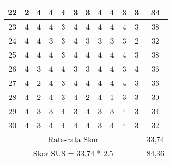 \begin{landscape}
\begin{longtable}{|c|c|c|c|c|c|c|c|c|c|c|c|}
		22& 2& 4& 4& 4& 3& 3& 4& 4& 3& 3& 34 \\ \hline
		23& 4& 4& 4& 3& 4& 4& 4& 4& 4& 3& 38 \\ \hline
		24& 4& 4& 3& 3& 4& 3& 3& 3& 3& 2& 32\\ \hline
		25& 4& 4& 4& 3& 4& 4& 4& 4& 4& 3& 38 \\ \hline
		26& 4& 3& 4& 4& 3& 3& 4& 4& 3& 4& 36 \\ \hline
		27& 4& 2& 4& 3& 4& 4& 4& 4& 4& 3& 36 \\ \hline
		28& 4& 2& 4& 3& 4& 2& 4& 1& 3& 3& 30 \\ \hline
		29& 4& 3& 3& 4& 3& 4& 3& 3& 4& 3& 34 \\ \hline
		30& 4& 3& 4& 4& 4& 4& 3& 4& 4& 3& 32  \\ \hline
		
		
		
		
		\hline \multicolumn{11}{|c|}{Rata-rata Skor}  & 33,74\\
		\hline \multicolumn{11}{|c|}{Skor SUS = 33.74 * 2.5}  & 84,36\\
		\hline
	\end{longtable}
\end{landscape}